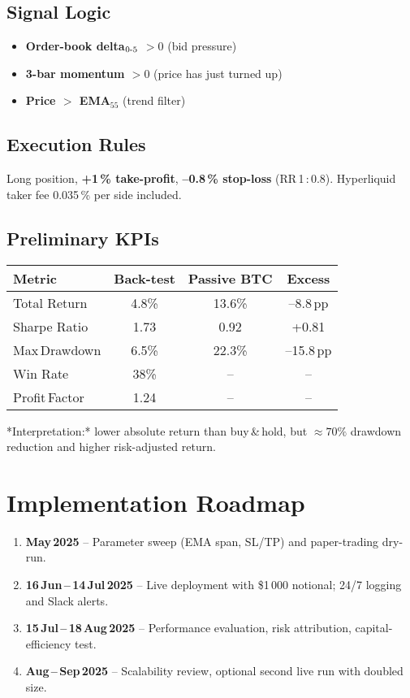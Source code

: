 \documentclass{article}
\begin{document}
\subsection{Signal Logic}
\begin{itemize}
  \item \textbf{Order-book delta\(_{0{\mathchar`-}5}\) \(>\!0\)} (bid pressure)
  \item \textbf{3-bar momentum \(>\!0\)} (price has just turned up)
  \item \textbf{Price \(>\) EMA\(_{55}\)} (trend filter)
\end{itemize}

\subsection{Execution Rules}
Long position, \textbf{+1\,\% take-profit}, \textbf{--0.8\,\% stop-loss}
(RR\,1\,:\,0.8).  
Hyperliquid taker fee 0.035\,\% per side included.

\subsection{Preliminary KPIs}
\begin{center}
\begin{tabular}{lccc}
\toprule
Metric & Back-test & Passive BTC & Excess\\ \midrule
Total Return & 4.8\% & 13.6\% & --8.8\,pp\\
Sharpe Ratio & 1.73 & 0.92 & +0.81\\
Max\,Drawdown & 6.5\% & 22.3\% & --15.8\,pp\\
Win Rate & 38\% & -- & --\\
Profit\,Factor & 1.24 & -- & --\\ \bottomrule
\end{tabular}
\end{center}

*Interpretation:* lower absolute return than buy\,\&\,hold, but
\(\approx70\%\) drawdown reduction and higher risk-adjusted return.

\section{Implementation Roadmap}

\begin{enumerate}
  \item \textbf{May\,2025} -- Parameter sweep (EMA span, SL/TP) and
        paper-trading dry-run.
  \item \textbf{16\,Jun\,--\,14\,Jul\,2025} -- Live deployment with
        \$1\,000 notional; 24/7 logging and Slack alerts.
  \item \textbf{15\,Jul\,--\,18\,Aug\,2025} -- Performance evaluation,
        risk attribution, capital-efficiency test.
  \item \textbf{Aug\,--\,Sep\,2025} -- Scalability review,
        optional second live run with doubled size.
\end{enumerate}
\end{document}
